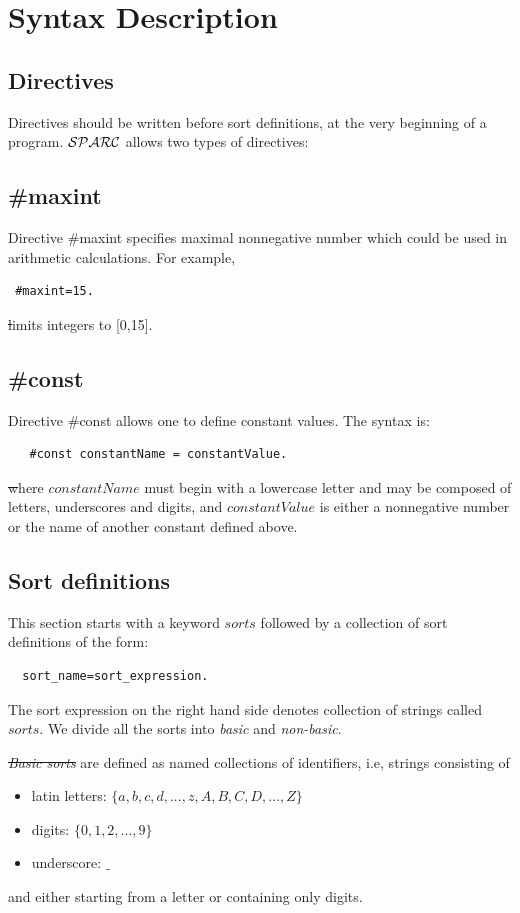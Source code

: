 \documentclass[12pt, letterpaper]{article}
\begin{document}
\section{Syntax Description}

\subsection{Directives}
Directives should be written before sort definitions, at the very beginning of a program.
${\cal SPARC}$ allows two types of directives:
\subsection*{\#maxint}
Directive \#maxint specifies maximal nonnegative number which could be used in arithmetic calculations. For example,
\begin{verbatim}
 #maxint=15.
\end{verbatim}
\st limits integers to [0,15].
\subsection*{\#const}
Directive \#const allows one to define constant values. The syntax is:
\begin{verbatim}
   #const constantName = constantValue.
\end{verbatim}      
\st where $constantName$  must begin with a lowercase letter and may be composed of letters, underscores and digits,
 and $constantValue$ is either a nonnegative number or the name of another constant defined above.  


\subsection{Sort definitions}\label{ss}

This section starts with a keyword $sorts$ followed by a collection of sort definitions of the form:

\begin{verbatim}
  sort_name=sort_expression.
\end{verbatim}

The sort expression on the right hand side denotes collection of strings called $sorts$. We divide all the sorts into \textit{basic} and \textit{non-basic}. 

\st \textit{Basic sorts} are defined as named collections of identifiers, i.e, strings consisting of
\begin{itemize}
 \item latin letters: $\{a,b,c,d,...,z,A,B,C,D,...,Z\}$
 \item digits: $\{0,1,2,...,9\}$
 \item underscore: $\_$
\end{itemize}
and either starting from a letter or containing only digits.
\end{document}
